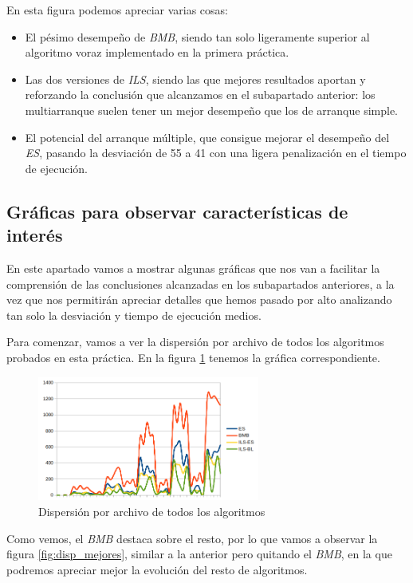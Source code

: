 En esta figura podemos apreciar varias cosas:

\begin{itemize}
    \item El pésimo desempeño de \textit{BMB}, siendo tan solo ligeramente superior al algoritmo voraz implementado en la primera práctica.
    \item Las dos versiones de \textit{ILS}, siendo las que mejores resultados aportan y reforzando la conclusión que alcanzamos en el subapartado anterior: los multiarranque suelen tener un mejor desempeño que los de arranque simple.
    \item El potencial del arranque múltiple, que consigue mejorar el desempeño del \textit{ES}, pasando la desviación de 55 a 41 con una ligera penalización en el tiempo de ejecución.
\end{itemize}


\subsection{Gráficas para observar características de interés}

En este apartado vamos a mostrar algunas gráficas que nos van a facilitar la comprensión de las conclusiones alcanzadas en los subapartados anteriores, a la vez que nos permitirán apreciar detalles que hemos pasado por alto analizando tan solo la desviación y tiempo de ejecución medios.

Para comenzar, vamos a ver la dispersión por archivo de todos los algoritmos probados en esta práctica. En la figura \ref{fig:dispTodos} tenemos la gráfica correspondiente.

\begin{figure}[H]
    \centering
    \includegraphics[width=0.65\textwidth]{"data/disp_todos.png"}
    \caption{Dispersión por archivo de todos los algoritmos}
    \label{fig:dispTodos}
\end{figure}

Como vemos, el \textit{BMB} destaca sobre el resto, por lo que vamos a observar la figura \ref{fig:disp_mejores}, similar a la anterior pero quitando el \textit{BMB}, en la que podremos apreciar mejor la evolución del resto de algoritmos.

